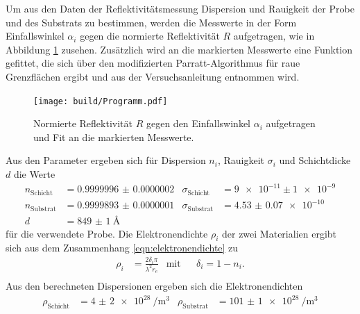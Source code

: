 Um aus den Daten der Reflektivitätsmessung Dispersion und Rauigkeit
der Probe und des Substrats zu bestimmen, werden die Messwerte in der Form
Einfallswinkel $\alpha_i$ gegen die
normierte Reflektivität $R$ aufgetragen, wie in Abbildung \ref{fig:messung}
zusehen. Zusätzlich wird an die markierten Messwerte
eine Funktion gefittet, die
sich über den
modifizierten Parratt-Algorithmus für raue Grenzflächen ergibt und
aus der Versuchsanleitung \cite{sample} entnommen wird.




\begin{figure}
 \centering
   \texttt{[image: build/Programm.pdf]}
   \caption{Normierte Reflektivität $R$ gegen den Einfallswinkel $\alpha_i$ aufgetragen und Fit an die markierten Messwerte.}
   \label{fig:messung}
\end{figure}

Aus den Parameter ergeben sich für Dispersion $n_i$, Rauigkeit $\sigma_i$ und Schichtdicke $d$ die Werte
\begin{align}
  n_{\mathrm{Schicht}}&= \num{0.9999996(2)}  & \sigma_{\mathrm{Schicht}}&= \num{9e-11} \pm \num{1e-9} \\
  n_{\mathrm{Substrat}}&= \num{0.9999893(1)} & \sigma_{\mathrm{Substrat}}&= \SI{4.53(7)e-10}{}\\ %
  d& =\SI{849(1)}{\angstrom}
\end{align}
für die verwendete Probe.
Die Elektronendichte $\rho_i$ der zwei Materialien ergibt sich aus dem Zusammenhang \eqref{eqn:elektronendichte} zu
\begin{align}
\rho_i&=\frac{2\delta_i \pi}{\lambda^2 r_e} &\text{mit}&  &\delta_i = 1 - n_i.\\
\end{align}
Aus den berechneten Dispersionen ergeben sich die Elektronendichten
\begin{align}
\rho_{\mathrm{Schicht}}&=\SI{4(2)e28}{\per\cubic\meter}  & \rho_{\mathrm{Substrat}}&=\SI{101(1)e28}{\per\cubic\meter}
\end{align}
